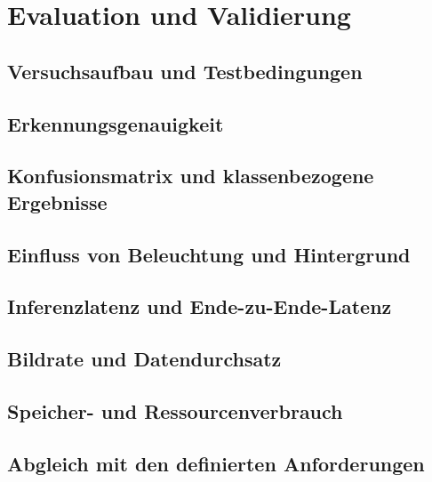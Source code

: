\chapter{Evaluation und Validierung}

\section{Versuchsaufbau und Testbedingungen}
\section{Erkennungsgenauigkeit}
\section{Konfusionsmatrix und klassenbezogene Ergebnisse}
\section{Einfluss von Beleuchtung und Hintergrund}
\section{Inferenzlatenz und Ende-zu-Ende-Latenz}
\section{Bildrate und Datendurchsatz}
\section{Speicher- und Ressourcenverbrauch}
\section{Abgleich mit den definierten Anforderungen}
